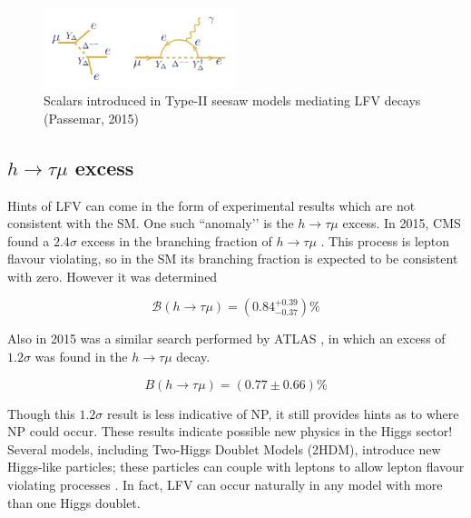 \documentclass[12pt]{thesis}  %
\newcommand{\br}{\mathcal{B}}
\newcommand{\htm}{h\to \tau \mu}
\begin{document}
\begin{figure}[h]
\centering
\includegraphics[width=0.5\textwidth]{images/seesaw-lfv-modes.png}
\caption{Scalars introduced in Type-II seesaw models mediating LFV decays (Passemar, 2015)}
\label{}
\end{figure}




\subsection{$\htm$ excess}

Hints of LFV can come in the form of experimental results which are not consistent with the SM. One such ``anomaly’’ is the $\htm$ excess. In 2015, CMS found a $2.4\sigma$ excess in the branching fraction of $\htm$ \cite{CMS:2015a}. This process is lepton flavour violating, so in the SM its branching fraction is expected to be consistent with zero. However it was determined

\begin{equation}
\br(h\to \tau \mu) = (0.84^{+0.39}_{-0.37})\%
\end{equation}


Also in 2015 was a similar search performed by ATLAS \cite{ATLAS:2015}, in which an excess of $1.2\sigma$ was found in the $\htm$ decay. 

\begin{equation}
B(\htm) = (0.77 \pm 0.66)\%
\end{equation}

Though this $1.2\sigma$ result is less indicative of NP, it still provides hints as to where NP could occur. These results indicate possible new physics in the Higgs sector! Several models, including Two-Higgs Doublet Models (2HDM), introduce new Higgs-like particles; these particles can couple with leptons to allow lepton flavour violating processes \cite{Harnik:2012}. In fact, LFV can occur naturally in any model with more than one Higgs doublet.
\end{document}
